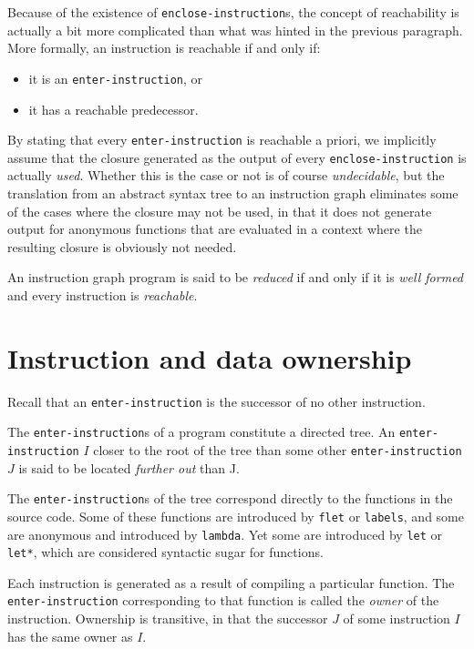 Because of the existence of \texttt{enclose-instruction}s, the concept
of reachability is actually a bit more complicated than what was
hinted in the previous paragraph.  More formally, an instruction is
reachable if and only if:

\begin{itemize}
\item it is an \texttt{enter-instruction}, or
\item it has a reachable predecessor.
\end{itemize}

By stating that every \texttt{enter-instruction} is reachable a
priori, we implicitly assume that the closure generated as the output
of every \texttt{enclose-instruction} is actually \emph{used}.
Whether this is the case or not is of course \emph{undecidable}, but
the translation from an abstract syntax tree to an instruction graph
eliminates some of the cases where the closure may not be used, in
that it does not generate output for anonymous functions that are
evaluated in a context where the resulting closure is obviously not
needed.

An instruction graph program is said to be \emph{reduced} if and only
if it is \emph{well formed} and every instruction is \emph{reachable}.

\section{Instruction and data ownership}

Recall that an \texttt{enter-instruction} is the successor of no other
instruction.

The \texttt{enter-instruction}s of a program constitute a directed
tree.  An \texttt{enter-instruction} $I$ closer to the root of the
tree than some other \texttt{enter-instruction} $J$ is said to be
located \emph{further out} than J.

The \texttt{enter-instruction}s of the tree correspond directly to the
functions in the source code.  Some of these functions are introduced
by \texttt{flet} or \texttt{labels}, and some are anonymous and
introduced by \texttt{lambda}.  Yet some are introduced by
\texttt{let} or \texttt{let*}, which are considered syntactic sugar
for functions.

Each instruction is generated as a result of compiling a particular
function.  The \texttt{enter-instruction} corresponding to that
function is called the \emph{owner} of the instruction.  Ownership is
transitive, in that the successor $J$ of some instruction $I$ has the
same owner as $I$.

